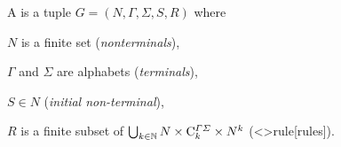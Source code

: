 \documentclass[../document.tex]{subfiles}
\begin{document}
    \begin{definition}
        A  is a tuple \(G = (N, \varGamma, \varSigma, S, R)\) where
        \begin{compactitem}
            \item \(N\) is a finite set (\emph{nonterminals}),
            \item \(\varGamma\) and \(\varSigma\) are alphabets (\emph{terminals}),
            \item \(S \in N\) (\emph{initial non-terminal}),
            \item \(R\) is a finite subset of \(\bigcup_{k \in \mathbb{N}} N \times \mathrm{C}^{\varGamma\varSigma}_k \times N^k\) (<\dcp>{rule}[rules]).
        \end{compactitem}
    \end{definition}


    \ifSubfilesClassLoaded{%
        \printindex
    }{}
\end{document}
